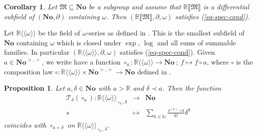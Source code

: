 \documentclass{article}
\newcommand{\llangle}{{\langle\!\langle}}
\newcommand{\of}{:}
\newcommand{\rrangle}{{\rangle\!\rangle}}
\newcommand{\tmem}[1]{{\em #1\/}}
\newtheorem{corollary}[theorem]{Corollary}
\newtheorem{proposition}[theorem]{Proposition}
\theoremstyle{remark}\newtheorem*{convention*}{Convention}
\begin{document}
\begin{corollary}
  Let $\mathfrak{M} \subseteq \mathbf{No}$ be a subgroup and assume that
  $\mathbb{R} \llbracket \mathfrak{M} \rrbracket$ is a differential subfield
  of $(\mathbf{No}, \partial)$ containing $\omega$. Then $(\mathbb{R}
  \llbracket \mathfrak{M} \rrbracket, \partial, \omega)$ satisfies
  {\tmem{(\ref{eq-spec-cond})}}.
\end{corollary}

Let $\mathbb{R} \llangle \omega \rrangle$ be the field of $\omega$-series as
defined in {\cite[Definition~4.7]{BM19}}. This is the smallest subfield of
$\mathbf{No}$ containing $\omega$ which is closed under $\exp$, $\log$ and all
sums of summable families. In particular $(\mathbb{R} \llangle \omega
\rrangle, \partial, \omega)$ satisfies (\ref{eq-spec-cond}). Given $a \in
\mathbf{No}^{>, \succ}$, we write have a function $\mathord{\circ_a} \of \mathbb{R} \llangle \omega \rrangle \longrightarrow
   \mathbf{No} \: ; \: f \mapsto f \circ a$,
where $\circ$ is the composition law $\mathord{\circ} \of \mathbb{R} \llangle
\omega \rrangle \times \mathbf{No}^{>, \succ} \longrightarrow \mathbf{No}$
defined in {\cite{BM19}}.

\begin{proposition}
  Let $a, \delta \in \mathbf{No}$ with $a >\mathbb{R}$ and $\delta \prec a$.
  Then the function
  \begin{eqnarray*}
    \mathcal{T}_{\delta} (\circ_a) \of \mathbb{R} \llangle \omega
    \rrangle_{\circ_a, \delta} & \longrightarrow & \mathbf{No}\\
    s & \longmapsto & \sum_{k \in \mathbb{N}} \frac{s^{(k)} \circ a}{k!}
    \delta^k
  \end{eqnarray*}
  coincides with $\circ_{a + \delta}$ on $\mathbb{R} \llangle \omega
  \rrangle_{\circ_a, \delta}$.
\end{proposition}
\end{document}
